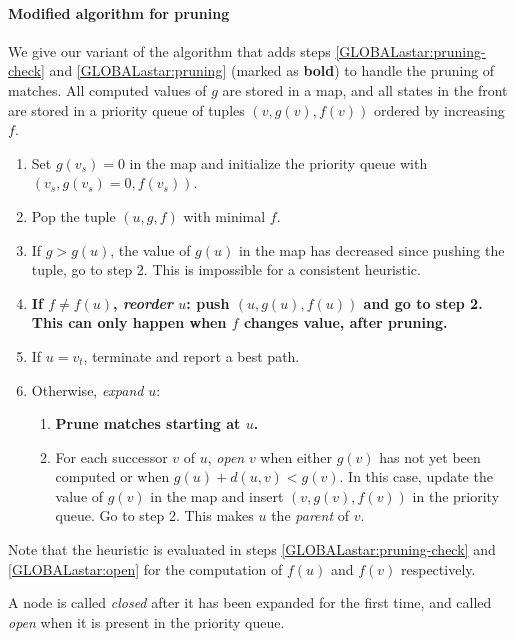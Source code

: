\paragraph{Modified \A algorithm for pruning} \label{GLOBALsec:astar}


We give our variant of the \A algorithm \citep{hart1968formal} that adds steps
\cref{GLOBALastar:pruning-check} and \cref{GLOBALastar:pruning} (marked as \textbf{bold}) to handle the
pruning of matches. All computed values of $g$ are stored in a map, and all
states in the front are stored in a priority queue of tuples $(v, g(v), f(v))$
ordered by increasing $f$.

\newcommand{\bolditem}{\refstepcounter{enumi}\item[\textbf{\theenumi.}]}
\newcommand{\boldsubitem}{\refstepcounter{enumii}\item[\textbf{\theenumii.}]}
\renewcommand{\algletter}{A}
\begin{enumerate}
  \item Set $g(v_s) = 0$ in the map and initialize the priority queue with
        $(v_s, g(v_s){=}0, f(v_s))$.
  \item Pop the tuple $(u, g, f)$ with minimal $f$.
  \item If $g > g(u)$, \ie the value of $g(u)$ in the map has decreased since pushing the
        tuple, go to step 2. This is impossible for a consistent heuristic.
  \item \label{GLOBALastar:pruning-check} \textbf{If $f \neq f(u)$, \emph{reorder} $u$: push $(u, g(u), f(u))$ and
        go to step 2. This can only happen when $f$ changes value, \ie after
        pruning.}
  \item If $u=v_t$, terminate and report a best path.
  \item Otherwise, \emph{expand} $u$:
  \begin{enumerate}
    \item \label{GLOBALastar:pruning} \textbf{Prune matches starting at $u$.}
    \item \label{GLOBALastar:open}
        For each successor $v$ of $u$, \emph{open} $v$ when either $g(v)$
        has not yet been computed or when $g(u) + d(u,v) < g(v)$.
        In this case, update the value of $g(v)$ in the map and insert $(v, g(v), f(v))$ in
        the priority queue. Go to step 2. This makes $u$ the \emph{parent} of $v$.
  \end{enumerate}
\end{enumerate}

Note that the heuristic is evaluated in steps \cref{GLOBALastar:pruning-check} and
\cref{GLOBALastar:open} for the computation of $f(u)$ and $f(v)$ respectively.

A node is called \emph{closed} after it has been expanded for the
first time, and called \emph{open} when it is present in the priority queue.
